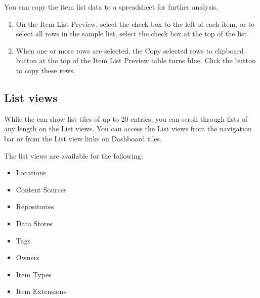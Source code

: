 \documentclass[letterpaper,10pt,english]{sphinxmanual}
\begin{document}
You can copy the item list data to a spreadsheet for further analysis.

\begin{enumerate}
\item {} 
On the Item List Preview, select the check box to the left of each item, or to select all rows in the sample list, select the check box at the top of the list.

\end{enumerate}
\begin{quote}

\begin{figure}[htbp]
\centering

\noindent{}
\end{figure}
\end{quote}
\begin{enumerate}
\setcounter{enumi}{1}
\item {} 
When one or more rows are selected, the Copy selected rows to clipboard button at the top of the Item List Preview table turns blue. Click the button to copy these rows.

\end{enumerate}


\subsection{List views}
\label{\detokenize{mcdmp_app_ug:list-views}}
While the  can show list tiles of up to 20 entries, you can scroll through lists of any length on the List views. You can access the List views from the navigation bar or from the List view links on Dashboard tiles.

The list views are available for the following:
\begin{itemize}
\item {} 
Locations

\item {} 
Content Sources

\item {} 
Repositories

\item {} 
Data Stores

\item {} 
Tags

\item {} 
Owners

\item {} 
Item Types

\item {} 
Item Extensions

\end{itemize}
\end{document}
